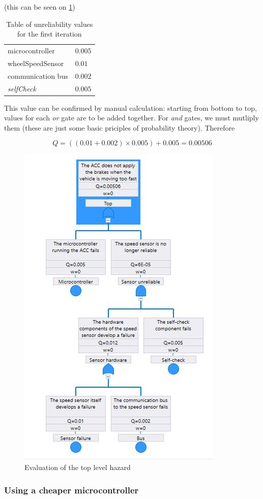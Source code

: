 \documentclass[a4paper]{article}
\begin{document}
(this can be seen on \cref{fig:eval_original})

\begin{table}
	\centering
	\begin{tabular}{ll}
		\toprule
		microcontroller          & \(0.005\) \\
		\gls{wheelSpeedSensor}   & \(0.01\)  \\
		communication bus        & \(0.002\) \\
		\textit{\gls{selfCheck}} & \(0.005\) \\
		\bottomrule
	\end{tabular}
	\caption{Table of unreliability values for the first iteration}%
	\label{tab:unreliability_original}
\end{table}

This value can be confirmed by manual calculation: starting from bottom to top,
values for each \emph{or} gate are to be added together. For \emph{and} gates,
we must mutliply them (these are just some basic priciples of probability
theory). Therefore

\[ Q = \left((0.01 + 0.002) \times 0.005\right) + 0.005 = 0.00506 \]

\begin{figure}
	\centering
	\includegraphics[width=.5\textwidth]{eval_original.jpg}
	\caption{Evaluation of the top level hazard}%
	\label{fig:eval_original}
\end{figure}

\subsubsection{Using a cheaper microcontroller}
\end{document}
